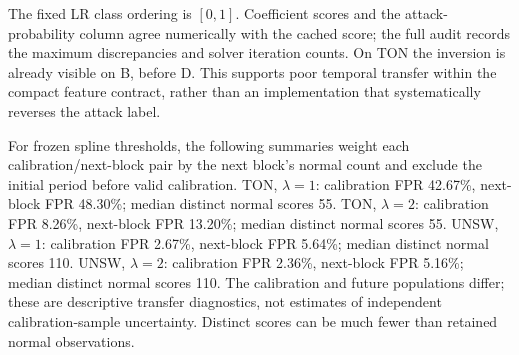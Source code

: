 The fixed LR class ordering is $[0,1]$. Coefficient scores and the attack-probability column agree numerically with the cached score; the full audit records the maximum discrepancies and solver iteration counts. On TON the inversion is already visible on B, before D. This supports poor temporal transfer within the compact feature contract, rather than an implementation that systematically reverses the attack label.

For frozen spline thresholds, the following summaries weight each calibration/next-block pair by the next block's normal count and exclude the initial period before valid calibration. TON, $\lambda=1$: calibration FPR 42.67\%, next-block FPR 48.30\%; median distinct normal scores 55. TON, $\lambda=2$: calibration FPR 8.26\%, next-block FPR 13.20\%; median distinct normal scores 55. UNSW, $\lambda=1$: calibration FPR 2.67\%, next-block FPR 5.64\%; median distinct normal scores 110. UNSW, $\lambda=2$: calibration FPR 2.36\%, next-block FPR 5.16\%; median distinct normal scores 110. The calibration and future populations differ; these are descriptive transfer diagnostics, not estimates of independent calibration-sample uncertainty. Distinct scores can be much fewer than retained normal observations.
